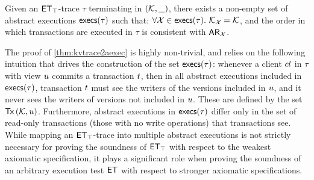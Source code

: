\begin{theorem}
\label{thm:kvtrace2aexec}
Given an $\mathsf{ET}_{\top}$-trace $\tau$ terminating in $(\mathcal{K}, \_)$, 
there exists a non-empty set of abstract executions $\execs(\tau)$
such that: $\forall \aexec \in \execs(\tau).\ \hh_{\aexec} = \hh$, 
and the order in which transactions are executed in $\tau$ is consistent with $\mathsf{AR}_{\mathcal{X}}$. 
\end{theorem}
\noindent 
The proof of \cref{thm:kvtrace2aexec} is highly
non-trivial, and relies on the following intuition that drives the construction of the set $\execs(\tau)$: 
whenever a client ${cl}$ in $\tau$  with view $u$ commits a transaction $t$, then in all 
abstract executions included in $\execs(\tau)$, transaction $t$ must see the writers  
of the versions included in $u$, and it never sees the writers of versions not included in $u$. 
These are defined by the set $\Tx[\hh, \vi]$. Furthermore, 
abstract executions in $\execs(\tau)$ differ only in the set of read-only transactions (\ie those with no write operations) 
that transactions see. While mapping an $\mathsf{ET}_{\top}$-trace into multiple abstract executions is 
not strictly necessary for proving the soundness of $\mathsf{ET}_{\top}$ with respect 
to the weakest axiomatic specification, it plays a significant role when proving the soundness 
of an arbitrary execution test $\mathsf{ET}$ with respect to stronger axiomatic specifications. 

